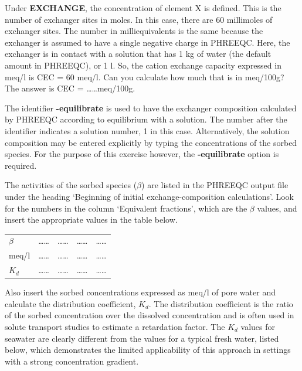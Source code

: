 Under \textbf{EXCHANGE}, the concentration of element X is defined. This is the number of exchanger sites in moles. In this case, there are 60 millimoles of exchanger sites. The number in milliequivalents is the same because the exchanger is assumed to have a single negative charge in PHREEQC. Here, the exchanger is in contact with a solution that has 1 kg of water (the default amount in PHREEQC), or 1 l. So, the cation exchange capacity expressed in meq/l is CEC = 60 meq/l. Can you calculate how much that is in meq/100g? The answer is CEC = \ldots\ldots meq/100g.

The identifier \textbf{-equilibrate} is used to have the exchanger composition calculated by PHREEQC according to equilibrium with a solution. The number after the identifier indicates a solution number, 1 in this case. Alternatively, the solution composition may be entered explicitly by typing the concentrations of the sorbed species. For the purpose of this exercise however, the \textbf{-equilibrate} option is required.

The activities of the sorbed species ($\beta$) are listed in the PHREEQC output file under the heading `Beginning of initial exchange-composition calculations'. Look for the numbers in the column `Equivalent fractions', which are the $\beta$ values, and insert the appropriate values in the table below.

\begin{table}[hb]
\centering
\footnotesize
\begin{tabular}{lllll}
\toprule
 & \na	& \ka & \ca & \mg \\
\midrule
$\beta$ & \ldots\ldots & \ldots\ldots & \ldots\ldots & \ldots\ldots \\
meq/l   & \ldots\ldots & \ldots\ldots & \ldots\ldots & \ldots\ldots \\
$K_d$   & \ldots\ldots & \ldots\ldots & \ldots\ldots & \ldots\ldots \\
\bottomrule
\end{tabular}
\end{table}

Also insert the sorbed concentrations expressed as meq/l of pore water and calculate the distribution coefficient, $K_d$. The distribution coefficient is the ratio of the sorbed concentration over the dissolved concentration and is often used in solute transport studies to estimate a retardation factor. The $K_d$ values for seawater are clearly different from the values for a typical fresh water, listed below, which demonstrates the limited applicability of this approach in settings with a strong concentration gradient.

